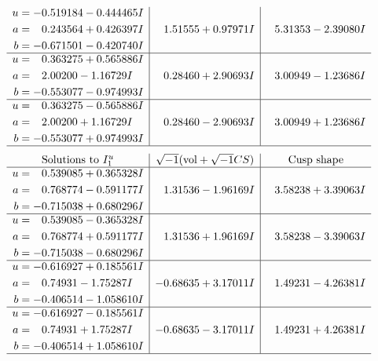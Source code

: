 \documentclass[1p]{elsarticle_modified}
\theoremstyle{definition}
\newcommand{\I}{\sqrt{-1}}
\begin{document}
$$\begin{array}{c|c|c}
\begin{aligned}
u &= -0.519184 - 0.444465 I \\
a &= \phantom{-}0.243564 + 0.426397 I \\
b &= -0.671501 - 0.420740 I\end{aligned}
 & \phantom{-}1.51555 + 0.97971 I & \phantom{-}5.31353 - 2.39080 I \\ \hline\begin{aligned}
u &= \phantom{-}0.363275 + 0.565886 I \\
a &= \phantom{-}2.00200 - 1.16729 I \\
b &= -0.553077 - 0.974993 I\end{aligned}
 & \phantom{-}0.28460 + 2.90693 I & \phantom{-}3.00949 - 1.23686 I \\ \hline\begin{aligned}
u &= \phantom{-}0.363275 - 0.565886 I \\
a &= \phantom{-}2.00200 + 1.16729 I \\
b &= -0.553077 + 0.974993 I\end{aligned}
 & \phantom{-}0.28460 - 2.90693 I & \phantom{-}3.00949 + 1.23686 I\\
 \hline 
 \end{array}$$\newpage$$\begin{array}{c|c|c}  
\text{Solutions to }I^u_{1}& \I (\text{vol} + \sqrt{-1}CS) & \text{Cusp shape}\\
 \hline 
\begin{aligned}
u &= \phantom{-}0.539085 + 0.365328 I \\
a &= \phantom{-}0.768774 - 0.591177 I \\
b &= -0.715038 + 0.680296 I\end{aligned}
 & \phantom{-}1.31536 - 1.96169 I & \phantom{-}3.58238 + 3.39063 I \\ \hline\begin{aligned}
u &= \phantom{-}0.539085 - 0.365328 I \\
a &= \phantom{-}0.768774 + 0.591177 I \\
b &= -0.715038 - 0.680296 I\end{aligned}
 & \phantom{-}1.31536 + 1.96169 I & \phantom{-}3.58238 - 3.39063 I \\ \hline\begin{aligned}
u &= -0.616927 + 0.185561 I \\
a &= \phantom{-}0.74931 - 1.75287 I \\
b &= -0.406514 - 1.058610 I\end{aligned}
 & -0.68635 + 3.17011 I & \phantom{-}1.49231 - 4.26381 I \\ \hline\begin{aligned}
u &= -0.616927 - 0.185561 I \\
a &= \phantom{-}0.74931 + 1.75287 I \\
b &= -0.406514 + 1.058610 I\end{aligned}
 & -0.68635 - 3.17011 I & \phantom{-}1.49231 + 4.26381 I\\
 \hline 
 \end{array}$$\newpage\newpage\renewcommand{\arraystretch}{1}
\end{document}
